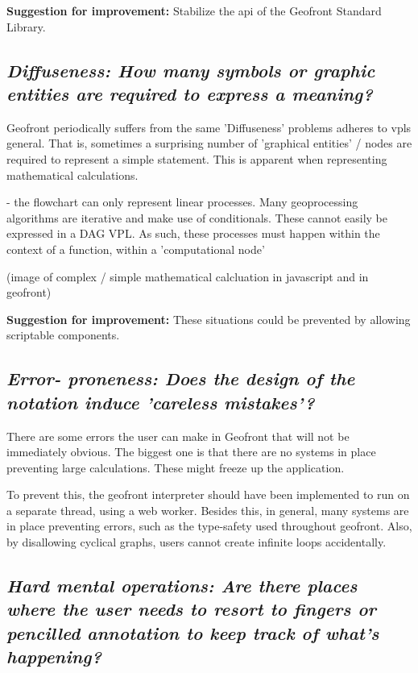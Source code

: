 \textbf{Suggestion for improvement:} Stabilize the api of the Geofront Standard Library.



\subsection*{\emph{Diffuseness: How many symbols or graphic entities are required to express a meaning? }}

Geofront periodically suffers from the same 'Diffuseness' problems \cite[]{green_usability_1996} adheres to vpls general. 
That is, sometimes a surprising number of 'graphical entities' / nodes are required to represent a simple statement.  
This is apparent when representing mathematical calculations. 

\begin{note}
  - the flowchart can only represent linear processes. Many geoprocessing algorithms are iterative and make use of conditionals. These cannot easily be expressed in a DAG VPL. As such, these processes must happen within the context of a function, within a 'computational node'  
\end{note}


(image of complex / simple mathematical calcluation in javascript and in geofront)

\textbf{Suggestion for improvement:} These situations could be prevented by allowing scriptable components. 

\subsection*{\emph{Error- proneness: Does the design of the notation induce 'careless mistakes'? }}

There are some errors the user can make  in Geofront that will not be immediately obvious. 
The biggest one is that there are no systems in place preventing large calculations. 
These might freeze up the application. 

To prevent this, the geofront interpreter should have been implemented to run on a separate thread, using a web worker. 
Besides this, in general, many systems are in place preventing errors, such as the type-safety used throughout geofront.
Also, by disallowing cyclical graphs, users cannot create infinite loops accidentally.

\subsection*{\emph{Hard mental operations: Are there places where the user needs to resort to fingers or pencilled annotation to keep track of what's happening? }}


